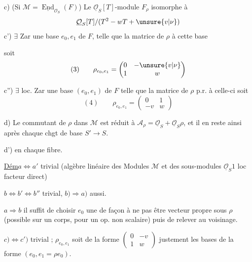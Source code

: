 c) (Si $\mathcal M=\underline{\operatorname{End}}_{\mathcal O_S}(F)$) Le $\underline{\mathcal O}_S[T]$-module $F_\rho$  isomorphe à
\[
\underline{\mathcal O}_S[T]/(T^2-wT+\unsure{v|\nu})
\]
c')  $\exists$  Zar une base $e_0,e_1$ de $F$, telle que la matrice de $\rho$  à cette base


soit
\[
(3)\qquad \rho_{e_0,e_1}=\begin{pmatrix}0&-\unsure{v|\nu}\\1&w\end{pmatrix}
\]

c'') 
$\exists$ loc. Zar une base $(e_0,e_1)$ de $F$ telle que la matrice de $\rho$ p.r. à celle-ci soit
\[
(4)\qquad \rho_{e_0,e_1}=\begin{pmatrix}0&1\\-v&w\end{pmatrix}
\]

d) Le commutant de $\rho$ dans $\mathcal M$ est réduit à
$\mathcal A_\rho=\underline{\mathcal O}_S+\underline{\mathcal O}_S\rho$, et il en reste ainsi après chaque chgt de base $S'\to S$.

d')  en chaque fibre.

\uline{Dém}\quad $a\Longleftrightarrow a'$ trivial (algèbre linéaire des Modules $\mathcal M$ et des sous-modules $\underline{\mathcal O}_S1$ loc facteur direct)

$b\Longleftrightarrow b'\Longleftrightarrow b''$ trivial, $b)\Longrightarrow a)$ aussi.

$a\Longrightarrow b$ il suffit de choisir $e_0$  une  de façon à ne pas être vecteur propre sous $\rho$ (possible sur un corps, pour un op. non scalaire) puis de relever au voisinage.

$c)\Longleftrightarrow c')$ trivial ; 
$\rho_{e_0,e_1}$ soit de la forme $\begin{pmatrix}0&-v\\1&w\end{pmatrix}$  justement les bases de la forme $(e_0,e_1=\rho e_0)$.


